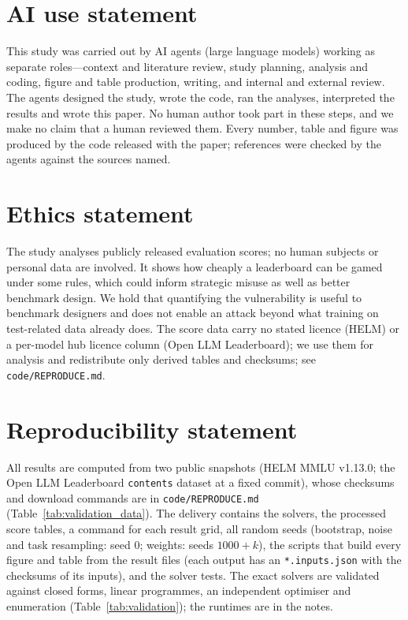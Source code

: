 \section*{AI use statement}
This study was carried out by AI agents (large language models) working as separate roles---context and literature review, study planning, analysis and coding, figure and table production, writing, and internal and external review. The agents designed the study, wrote the code, ran the analyses, interpreted the results and wrote this paper. No human author took part in these steps, and we make no claim that a human reviewed them. Every number, table and figure was produced by the code released with the paper; references were checked by the agents against the sources named.

\section*{Ethics statement}
The study analyses publicly released evaluation scores; no human subjects or personal data are involved. It shows how cheaply a leaderboard can be gamed under some rules, which could inform strategic misuse as well as better benchmark design. We hold that quantifying the vulnerability is useful to benchmark designers and does not enable an attack beyond what training on test-related data already does. The score data carry no stated licence (HELM) or a per-model hub licence column (Open LLM Leaderboard); we use them for analysis and redistribute only derived tables and checksums; see \texttt{code/REPRODUCE.md}.

\section*{Reproducibility statement}
All results are computed from two public snapshots (HELM MMLU v1.13.0; the Open LLM Leaderboard \texttt{contents} dataset at a fixed commit), whose checksums and download commands are in \texttt{code/REPRODUCE.md} (Table~\ref{tab:validation_data}). The delivery contains the solvers, the processed score tables, a command for each result grid, all random seeds (bootstrap, noise and task resampling: seed 0; weights: seeds $1000+k$), the scripts that build every figure and table from the result files (each output has an \texttt{*.inputs.json} with the checksums of its inputs), and the solver tests. The exact solvers are validated against closed forms, linear programmes, an independent optimiser and enumeration (Table~\ref{tab:validation}); the runtimes are in the notes.
